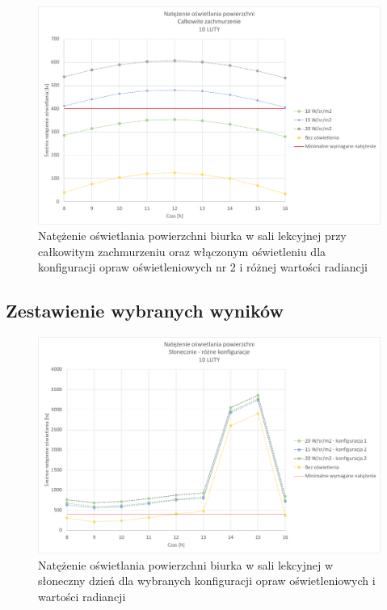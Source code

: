 \documentclass[a4paper,12pt]{article}
\begin{document}
	\begin{figure}[!ht]
		\centering
		\includegraphics[width=\linewidth]{Wykresy/oswietlenie_2_calkowite_zachmurzenie.pdf}
		\caption{Natężenie oświetlania powierzchni biurka w sali lekcyjnej przy całkowitym zachmurzeniu  oraz włączonym oświetleniu dla konfiguracji opraw oświetleniowych nr 2 i różnej wartości radiancji}
		\label{oswietlenie_2_calkowite_zachmurzenie}
	\end{figure}

	\subsection{Zestawienie wybranych wyników}
	\label{sec:zestawienie_wybranych_wynikow}
	
	\begin{figure}[!ht]
		\centering
		\includegraphics[width=\linewidth]{Wykresy/oswietlenie_slonecznie_rozne_konfiguracje.pdf}
		\caption{Natężenie oświetlania powierzchni biurka w sali lekcyjnej w słoneczny dzień dla wybranych konfiguracji opraw oświetleniowych i wartości radiancji}
		\label{oswietlenie_slonecznie_rozne_konfiguracje}
	\end{figure}
\end{document}
